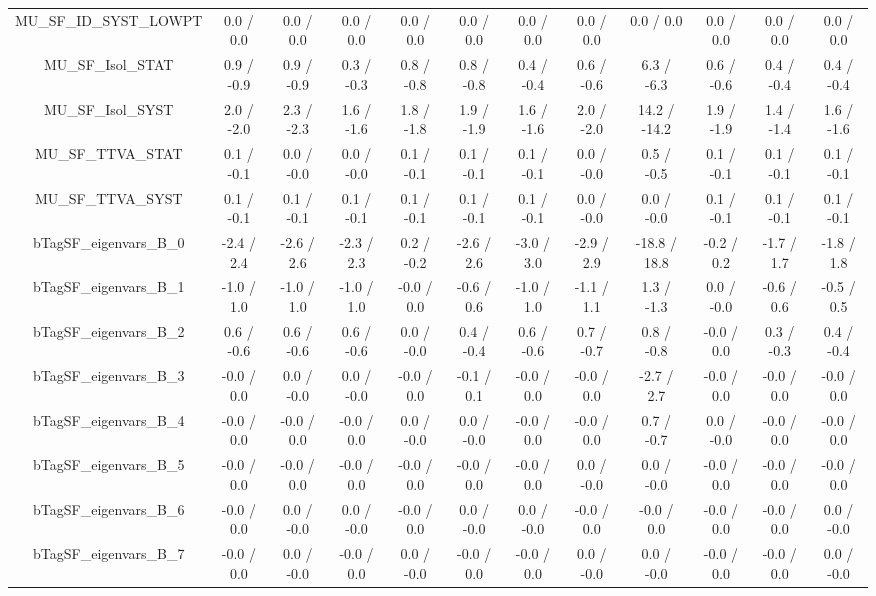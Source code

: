 \begin{table}[htbp]
\begin{center}
\begin{tabular}{|c|c|c|c|c|c|c|c|c|c|c|c|}
  MU_SF_ID_SYST_LOWPT & 0.0 / 0.0 & 0.0 / 0.0 & 0.0 / 0.0 & 0.0 / 0.0 & 0.0 / 0.0 & 0.0 / 0.0 & 0.0 / 0.0 & 0.0 / 0.0 & 0.0 / 0.0 & 0.0 / 0.0 & 0.0 / 0.0 \\ 
  MU_SF_Isol_STAT & 0.9 / -0.9 & 0.9 / -0.9 & 0.3 / -0.3 & 0.8 / -0.8 & 0.8 / -0.8 & 0.4 / -0.4 & 0.6 / -0.6 & 6.3 / -6.3 & 0.6 / -0.6 & 0.4 / -0.4 & 0.4 / -0.4 \\ 
  MU_SF_Isol_SYST & 2.0 / -2.0 & 2.3 / -2.3 & 1.6 / -1.6 & 1.8 / -1.8 & 1.9 / -1.9 & 1.6 / -1.6 & 2.0 / -2.0 & 14.2 / -14.2 & 1.9 / -1.9 & 1.4 / -1.4 & 1.6 / -1.6 \\ 
  MU_SF_TTVA_STAT & 0.1 / -0.1 & 0.0 / -0.0 & 0.0 / -0.0 & 0.1 / -0.1 & 0.1 / -0.1 & 0.1 / -0.1 & 0.0 / -0.0 & 0.5 / -0.5 & 0.1 / -0.1 & 0.1 / -0.1 & 0.1 / -0.1 \\ 
  MU_SF_TTVA_SYST & 0.1 / -0.1 & 0.1 / -0.1 & 0.1 / -0.1 & 0.1 / -0.1 & 0.1 / -0.1 & 0.1 / -0.1 & 0.0 / -0.0 & 0.0 / -0.0 & 0.1 / -0.1 & 0.1 / -0.1 & 0.1 / -0.1 \\ 
  bTagSF_eigenvars_B_0 & -2.4 / 2.4 & -2.6 / 2.6 & -2.3 / 2.3 & 0.2 / -0.2 & -2.6 / 2.6 & -3.0 / 3.0 & -2.9 / 2.9 & -18.8 / 18.8 & -0.2 / 0.2 & -1.7 / 1.7 & -1.8 / 1.8 \\ 
  bTagSF_eigenvars_B_1 & -1.0 / 1.0 & -1.0 / 1.0 & -1.0 / 1.0 & -0.0 / 0.0 & -0.6 / 0.6 & -1.0 / 1.0 & -1.1 / 1.1 & 1.3 / -1.3 & 0.0 / -0.0 & -0.6 / 0.6 & -0.5 / 0.5 \\ 
  bTagSF_eigenvars_B_2 & 0.6 / -0.6 & 0.6 / -0.6 & 0.6 / -0.6 & 0.0 / -0.0 & 0.4 / -0.4 & 0.6 / -0.6 & 0.7 / -0.7 & 0.8 / -0.8 & -0.0 / 0.0 & 0.3 / -0.3 & 0.4 / -0.4 \\ 
  bTagSF_eigenvars_B_3 & -0.0 / 0.0 & 0.0 / -0.0 & 0.0 / -0.0 & -0.0 / 0.0 & -0.1 / 0.1 & -0.0 / 0.0 & -0.0 / 0.0 & -2.7 / 2.7 & -0.0 / 0.0 & -0.0 / 0.0 & -0.0 / 0.0 \\ 
  bTagSF_eigenvars_B_4 & -0.0 / 0.0 & -0.0 / 0.0 & -0.0 / 0.0 & 0.0 / -0.0 & 0.0 / -0.0 & -0.0 / 0.0 & -0.0 / 0.0 & 0.7 / -0.7 & 0.0 / -0.0 & -0.0 / 0.0 & -0.0 / 0.0 \\ 
  bTagSF_eigenvars_B_5 & -0.0 / 0.0 & -0.0 / 0.0 & -0.0 / 0.0 & -0.0 / 0.0 & -0.0 / 0.0 & -0.0 / 0.0 & 0.0 / -0.0 & 0.0 / -0.0 & -0.0 / 0.0 & -0.0 / 0.0 & -0.0 / 0.0 \\ 
  bTagSF_eigenvars_B_6 & -0.0 / 0.0 & 0.0 / -0.0 & 0.0 / -0.0 & -0.0 / 0.0 & 0.0 / -0.0 & 0.0 / -0.0 & -0.0 / 0.0 & -0.0 / 0.0 & -0.0 / 0.0 & -0.0 / 0.0 & 0.0 / -0.0 \\ 
  bTagSF_eigenvars_B_7 & -0.0 / 0.0 & 0.0 / -0.0 & -0.0 / 0.0 & 0.0 / -0.0 & -0.0 / 0.0 & -0.0 / 0.0 & 0.0 / -0.0 & 0.0 / -0.0 & -0.0 / 0.0 & -0.0 / 0.0 & 0.0 / -0.0 \\ 

\end{tabular}
\end{center}
\end{table}
